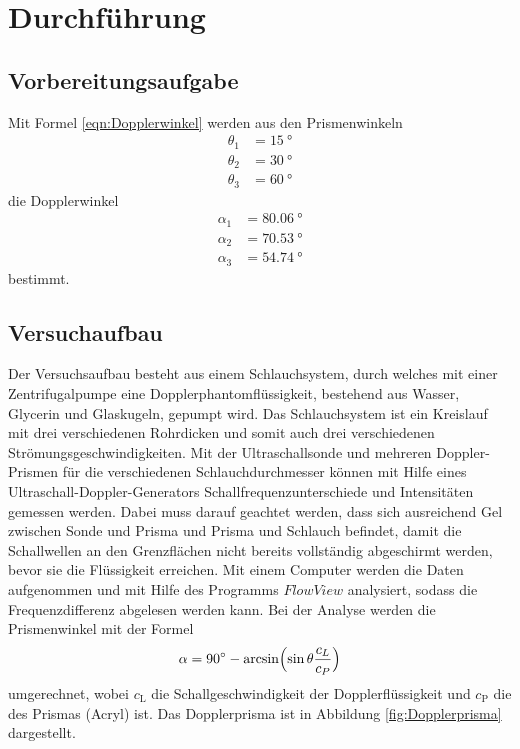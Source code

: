  \section{Durchführung}
\label{sec:Durchführung}

\subsection{Vorbereitungsaufgabe}

Mit Formel \eqref{eqn:Dopplerwinkel} werden aus den Prismenwinkeln
\begin{align*}
  \theta_1 & = \SI{15}{\degree} \\
  \theta_2 & = \SI{30}{\degree} \\
  \theta_3 & = \SI{60}{\degree}
\end{align*}
die Dopplerwinkel
\begin{align*}
  \alpha_1 & = \SI{80.06}{\degree} \\
  \alpha_2 & = \SI{70.53}{\degree} \\
  \alpha_3 & = \SI{54.74}{\degree}
\end{align*}
bestimmt.

\subsection{Versuchaufbau}

Der Versuchsaufbau besteht aus einem Schlauchsystem, durch welches mit einer
Zentrifugalpumpe eine Dopplerphantomflüssigkeit, bestehend aus Wasser,
Glycerin und Glaskugeln, gepumpt wird.
Das Schlauchsystem ist ein Kreislauf mit drei verschiedenen Rohrdicken und
somit auch drei verschiedenen Strömungsgeschwindigkeiten. Mit der
Ultraschallsonde und mehreren Doppler-Prismen für die verschiedenen
Schlauchdurchmesser können mit Hilfe eines Ultraschall-Doppler-Generators
Schallfrequenzunterschiede und Intensitäten gemessen werden. Dabei muss darauf
geachtet werden, dass sich ausreichend Gel zwischen Sonde und Prisma und
Prisma und Schlauch befindet, damit die Schallwellen an den Grenzflächen
nicht bereits vollständig abgeschirmt werden, bevor sie die Flüssigkeit
erreichen. Mit einem
Computer werden die Daten aufgenommen und mit Hilfe des Programms
$FlowView$ analysiert, sodass die
Frequenzdifferenz abgelesen werden kann.
Bei der Analyse werden die Prismenwinkel mit der Formel
\begin{align}
  \alpha = \SI{90}{\degree} - \arcsin\Bigl(\sin{\theta}\frac{c_L}{c_P}\Bigr)
  \label{eqn:Dopplerwinkel}
\end{align}
umgerechnet, wobei $c_\text{L}$ die Schallgeschwindigkeit der Dopplerflüssigkeit
und $c_\text{P}$ die des Prismas (Acryl) ist.
Das Dopplerprisma ist in Abbildung \ref{fig:Dopplerprisma} dargestellt.

